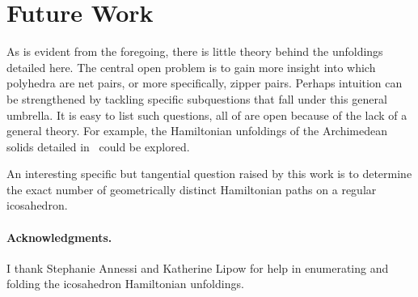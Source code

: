 \pdfoutput=1  \documentclass[]{article}
\newcommand{\seclab}[1]{\label{sec:#1}}
\begin{document}
\section{Future Work}
\seclab{Future}
As is evident from the foregoing, there is little theory behind the
unfoldings detailed here.
The central open problem is to gain more insight into which polyhedra
are net pairs, or more specifically, zipper pairs.
Perhaps intuition can be strengthened by tackling specific subquestions that
fall under this general umbrella.  It is easy to list such questions,
all of are open because of the lack of a general theory.
For example, the Hamiltonian unfoldings of the Archimedean solids
detailed in~\cite{lddss-zupc-10} could be explored.

An interesting specific but tangential question raised by this work is to determine the exact
number of geometrically distinct Hamiltonian paths on a regular icosahedron.


\paragraph{Acknowledgments.}
I thank Stephanie Annessi and Katherine Lipow for help in enumerating
and folding the
icosahedron Hamiltonian unfoldings.



\end{document}
